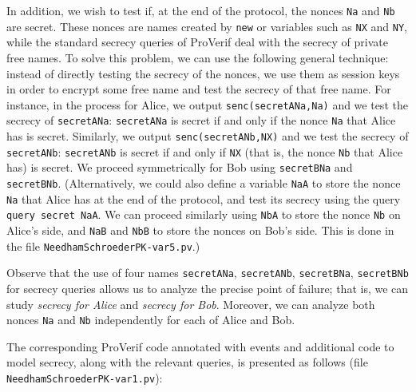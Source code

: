 \documentclass{book}
\begin{document}
In addition, we wish to test if, at the end of the protocol, the nonces \lstinline!Na! and \lstinline!Nb! are secret. These nonces are names created by \lstinline{new} or variables such as \lstinline!NX! and \lstinline!NY!, while the standard secrecy queries of ProVerif deal with the secrecy of private free names. To solve this problem, we can use the following general technique: instead of directly testing the secrecy of the nonces, we use them as session keys in order to encrypt some free name and test the secrecy of that free name. For instance, in the process for Alice, we output \lstinline!senc(secretANa,Na)! and we test the secrecy of \lstinline!secretANa!: \lstinline!secretANa! is secret if and only if the nonce \lstinline!Na! that Alice has is secret. Similarly,  we output \lstinline!senc(secretANb,NX)! and we test the secrecy of \lstinline!secretANb!: \lstinline!secretANb! is secret if and only if \lstinline!NX! (that is, the nonce \lstinline!Nb! that Alice has) is secret. We proceed symmetrically for Bob using \lstinline!secretBNa! and \lstinline!secretBNb!. (Alternatively, we could also define a variable \lstinline!NaA! to store the nonce \lstinline!Na! that Alice has at the end of the protocol, and test its secrecy using the query \lstinline!query secret NaA!. We can proceed similarly using \lstinline!NbA! to store the nonce \lstinline!Nb! on Alice's side, and \lstinline!NaB! and \lstinline!NbB! to store the nonces on Bob's side. This is done in the file \texttt{{\docexdir}NeedhamSchroederPK-var5.pv}.)

Observe that the use of four names \lstinline!secretANa!, \lstinline!secretANb!, \lstinline!secretBNa!, \lstinline!secretBNb! for secrecy queries allows us to analyze the precise point of failure; that is, we can study \emph{secrecy for Alice} and \emph{secrecy for Bob}. Moreover, we can analyze both nonces \lstinline!Na! and \lstinline!Nb! independently for each of Alice and Bob.

The corresponding ProVerif code annotated with events and additional code to model secrecy, along with the relevant queries, is presented as follows (file \texttt{{\docexdir}NeedhamSchroederPK-var1.pv}):
%

%
\end{document}
